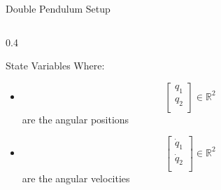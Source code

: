\begin{frame}{Double Pendulum Setup}
\begin{columns}
\begin{column}{0.4\textwidth}
\begin{block}{State Variables}
                Where:
                \begin{itemize}
                    \item  \[
                    \begin{bmatrix}
                            q_1 \\
                            q_2 \\ 
                    \end{bmatrix}
                    \in \mathbb{R}^2
                    \]   
                    are the angular positions
                    \item \[
                        \begin{bmatrix}
                                \dot{q}_1 \\
                                \dot{q}_2 \\
                        \end{bmatrix}
                        \in \mathbb{R}^2
                    \]
                    are the angular velocities

                \end{itemize}
            \end{block}
        \end{column}
    \end{columns}
\end{frame}

